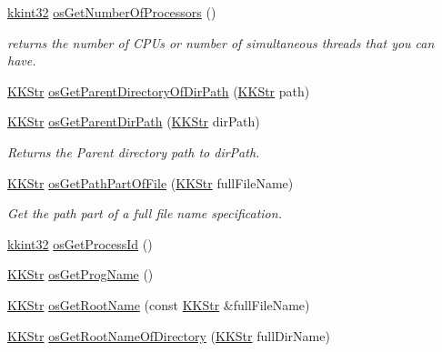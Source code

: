 \begin{DoxyCompactItemize}
\hyperlink{namespace_k_k_b_a8fa4952cc84fda1de4bec1fbdd8d5b1b}{kkint32} \hyperlink{namespace_k_k_b_a25dacbc05d570584cc98a2396cf9d998}{os\+Get\+Number\+Of\+Processors} ()
\begin{DoxyCompactList}\small\item\em returns the number of C\+PU\textquotesingle{}s or number of simultaneous threads that you can have. \end{DoxyCompactList}\item 
\hyperlink{class_k_k_b_1_1_k_k_str}{K\+K\+Str} \hyperlink{namespace_k_k_b_a12d26bf1bffe6e73e2f5eb57120064a6}{os\+Get\+Parent\+Directory\+Of\+Dir\+Path} (\hyperlink{class_k_k_b_1_1_k_k_str}{K\+K\+Str} path)
\item 
\hyperlink{class_k_k_b_1_1_k_k_str}{K\+K\+Str} \hyperlink{namespace_k_k_b_aed679531f60967a58fc42fd4e34e8b4b}{os\+Get\+Parent\+Dir\+Path} (\hyperlink{class_k_k_b_1_1_k_k_str}{K\+K\+Str} dir\+Path)
\begin{DoxyCompactList}\small\item\em Returns the Parent directory path to \textquotesingle{}dir\+Path\textquotesingle{}. \end{DoxyCompactList}\item 
\hyperlink{class_k_k_b_1_1_k_k_str}{K\+K\+Str} \hyperlink{namespace_k_k_b_a38ede02e5dd6c77a3171427f86fac02f}{os\+Get\+Path\+Part\+Of\+File} (\hyperlink{class_k_k_b_1_1_k_k_str}{K\+K\+Str} full\+File\+Name)
\begin{DoxyCompactList}\small\item\em Get the path part of a full file name specification. \end{DoxyCompactList}\item 
\hyperlink{namespace_k_k_b_a8fa4952cc84fda1de4bec1fbdd8d5b1b}{kkint32} \hyperlink{namespace_k_k_b_a4aab3273be8e9708a2ed508c1d87e350}{os\+Get\+Process\+Id} ()
\item 
\hyperlink{class_k_k_b_1_1_k_k_str}{K\+K\+Str} \hyperlink{namespace_k_k_b_a2350af4ae9ba28f74ec9a564b7d7f2b0}{os\+Get\+Prog\+Name} ()
\item 
\hyperlink{class_k_k_b_1_1_k_k_str}{K\+K\+Str} \hyperlink{namespace_k_k_b_af5b668ed9902d7f93b62529664a739f0}{os\+Get\+Root\+Name} (const \hyperlink{class_k_k_b_1_1_k_k_str}{K\+K\+Str} \&full\+File\+Name)
\item 
\hyperlink{class_k_k_b_1_1_k_k_str}{K\+K\+Str} \hyperlink{namespace_k_k_b_a456628fbc248c742b076e5f8b2456c98}{os\+Get\+Root\+Name\+Of\+Directory} (\hyperlink{class_k_k_b_1_1_k_k_str}{K\+K\+Str} full\+Dir\+Name)
\item 

\end{DoxyCompactItemize}
